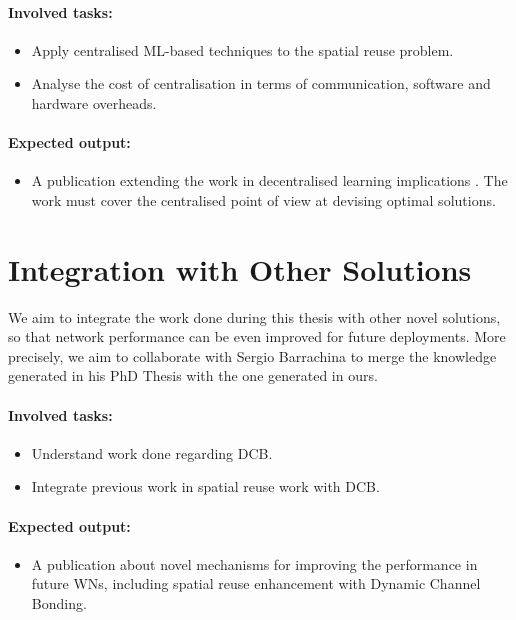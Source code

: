 \documentclass[12pt, a4paper,twoside]{tesi_upf}
\begin{document}
			\paragraph{Involved tasks:}		
			\begin{itemize}
				\item Apply centralised ML-based techniques to the spatial reuse problem.
				\item Analyse the cost of centralisation in terms of communication, software and hardware overheads.
			\end{itemize}	
			\paragraph{Expected output:}		
			\begin{itemize}
				\item A publication extending the work in decentralised learning implications \cite{wilhelmi2017implications, wilhelmi2017enhancing}. The work must cover the centralised point of view at devising optimal solutions.				
			\end{itemize}		
		
		\section{Integration with Other Solutions}
		\label{section:contribution5}
			We aim to integrate the work done during this thesis with other novel solutions, so that network performance can be even improved for future deployments. More precisely, we aim to collaborate with Sergio Barrachina to merge the knowledge generated in his PhD Thesis with the one generated in ours.	
			
			\paragraph{Involved tasks:}		
			\begin{itemize}
				\item Understand work done regarding DCB.
				\item Integrate previous work in spatial reuse work with DCB.			
			\end{itemize}	
			\paragraph{Expected output:}		
			\begin{itemize}
				\item A publication about novel mechanisms for improving the performance in future WNs, including spatial reuse enhancement with Dynamic Channel Bonding.			
			\end{itemize}		
			
	
	
\end{document}
